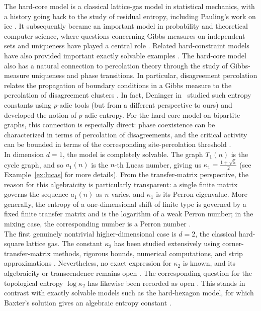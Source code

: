 \documentclass{article}
\theoremstyle{plain}
\theoremstyle{definition}
\theoremstyle{remark}
\begin{document}
The hard-core model is a classical lattice-gas model in statistical mechanics,
with a history going back to the study of residual entropy, including
Pauling's work on ice \cite{Pauling1935,BaxterBook1982}. It subsequently
became an important model in probability and theoretical computer science,
where questions concerning Gibbs measures on independent sets and uniqueness
have played a central role \cite{Weitz2006,Sly2010}. Related hard-constraint
models have also provided important exactly solvable examples
\cite{BrightwellWinkler2002}. 
The hard-core model also has a natural connection to percolation theory through
the study of Gibbs-measure uniqueness and phase transitions. In particular,
disagreement percolation relates the propagation of boundary conditions in a
Gibbs measure to the percolation of disagreement clusters
\cite{vanDenBergMaes1994,vanDenBergSteif1994, HuChen1991, LiuEvans2000}. In fact, Deninger in~\cite{deninger2010p} studied such entropy constants using $p$-adic tools (but from a different perspective to ours) and developed the notion of $p$-adic entropy. For the hard-core model on
bipartite graphs, this connection is especially direct: phase coexistence can
be characterized in terms of percolation of disagreements, and the critical
activity can be bounded in terms of the corresponding site-percolation
threshold \cite{vanDenBergSteif1994,GeorgiiHaggstromMaes2001}. \\

In dimension $d=1$, the model is completely solvable. The graph $T_1(n)$ is
the cycle graph, and so $a_1(n)$ is the $n$-th Lucas number, giving us $\kappa_1=\frac{1+\sqrt5}{2}$ (see Example~\ref{ex:lucas} for more details). From the transfer-matrix perspective, the
reason for this algebraicity is particularly transparent: a single finite
matrix governs the sequence $a_1(n)$ as $n$ varies, and $\kappa_1$ is its
Perron eigenvalue. More generally, the entropy of a one-dimensional shift of
finite type is governed by a fixed finite transfer matrix and is the
logarithm of a weak Perron number; in the mixing case, the corresponding
number is a Perron number \cite{Lind1984}.\\

The first genuinely nontrivial higher-dimensional case is $d=2$, the
classical hard-square lattice gas. The constant $\kappa_2$ has been studied
extensively using corner-transfer-matrix methods, rigorous bounds, numerical
computations, and strip approximations
\cite{baxter1980hard,CalkinWilf1998,baxter1999planar,Pavlov2012}.
Nevertheless, no exact expression for $\kappa_2$ is known, and its
algebraicity or transcendence remains open
\cite{liang2025independent}. The corresponding question for the topological
entropy $\log\kappa_2$ has likewise been recorded as open
\cite{ban2021topological}. This stands in contrast with exactly solvable
models such as the hard-hexagon model, for which Baxter's solution gives an
algebraic entropy constant \cite{Baxter1980}.\\
\end{document}
